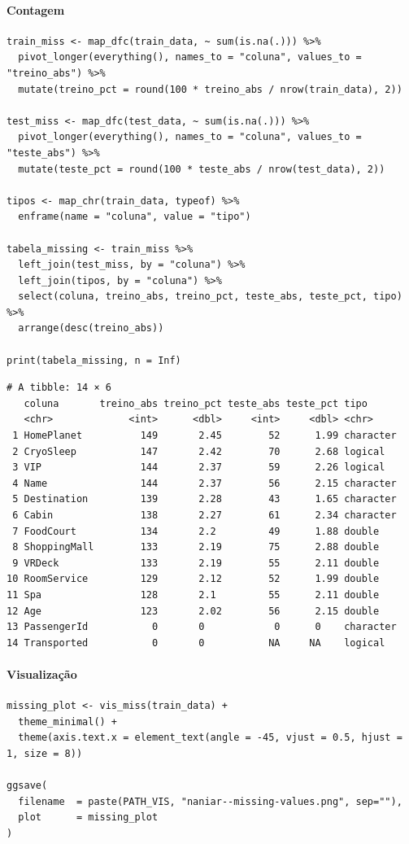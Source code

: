\documentclass[12pt,a4paper]{article}
\begin{document}
\paragraph{Contagem}
\label{sec:org1e7aa1a}
\begin{verbatim}
train_miss <- map_dfc(train_data, ~ sum(is.na(.))) %>%
  pivot_longer(everything(), names_to = "coluna", values_to = "treino_abs") %>%
  mutate(treino_pct = round(100 * treino_abs / nrow(train_data), 2))

test_miss <- map_dfc(test_data, ~ sum(is.na(.))) %>%
  pivot_longer(everything(), names_to = "coluna", values_to = "teste_abs") %>%
  mutate(teste_pct = round(100 * teste_abs / nrow(test_data), 2))

tipos <- map_chr(train_data, typeof) %>%
  enframe(name = "coluna", value = "tipo")

tabela_missing <- train_miss %>%
  left_join(test_miss, by = "coluna") %>%
  left_join(tipos, by = "coluna") %>%
  select(coluna, treino_abs, treino_pct, teste_abs, teste_pct, tipo) %>%
  arrange(desc(treino_abs))

print(tabela_missing, n = Inf)
\end{verbatim}

\label{org5a68c68}
\begin{verbatim}
# A tibble: 14 × 6
   coluna       treino_abs treino_pct teste_abs teste_pct tipo     
   <chr>             <int>      <dbl>     <int>     <dbl> <chr>    
 1 HomePlanet          149       2.45        52      1.99 character
 2 CryoSleep           147       2.42        70      2.68 logical  
 3 VIP                 144       2.37        59      2.26 logical  
 4 Name                144       2.37        56      2.15 character
 5 Destination         139       2.28        43      1.65 character
 6 Cabin               138       2.27        61      2.34 character
 7 FoodCourt           134       2.2         49      1.88 double   
 8 ShoppingMall        133       2.19        75      2.88 double   
 9 VRDeck              133       2.19        55      2.11 double   
10 RoomService         129       2.12        52      1.99 double   
11 Spa                 128       2.1         55      2.11 double   
12 Age                 123       2.02        56      2.15 double   
13 PassengerId           0       0            0      0    character
14 Transported           0       0           NA     NA    logical
\end{verbatim}
\paragraph{Visualização}
\label{sec:org0876b83}
\begin{verbatim}
missing_plot <- vis_miss(train_data) +
  theme_minimal() +
  theme(axis.text.x = element_text(angle = -45, vjust = 0.5, hjust = 1, size = 8))

ggsave(
  filename  = paste(PATH_VIS, "naniar--missing-values.png", sep=""),
  plot      = missing_plot
)
\end{verbatim}
\end{document}
